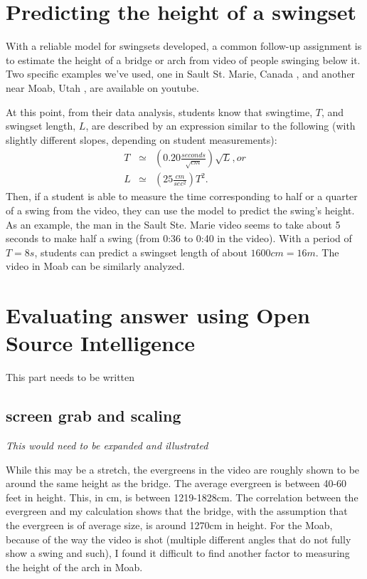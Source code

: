 \documentclass[12pt]{iopart}
\newcommand{\bea}{\begin{eqnarray}}
\newcommand{\eea}{\end{eqnarray}}
\begin{document}
\section{Predicting the height of a swingset}
With a reliable model for swingsets developed, a common follow-up assignment is to estimate the height of a bridge or arch from video of people swinging below it.  Two specific examples we've used, one in Sault St. Marie, Canada \cite{swingset-sault-ste-marie}, and another near Moab, Utah \cite{swingset-Moab}, are available on youtube.  

At this point, from their data analysis, students know that swingtime, $T$, and swingset length, $L$, are described by an expression similar to the following (with slightly different slopes, depending on student measurements):
\bea
T &\simeq& \left( 0.20\frac{seconds}{\sqrt{cm}} \right) \sqrt{L}, or\\
L &\simeq& \left( 25 \frac{cm}{sec^2} \right) T^2.
\eea
Then, if a student is able to measure the time corresponding to half or a quarter of a swing from the video, they can use the model to predict the swing's height.  As an example, the man in the Sault Ste. Marie video seems to take about 5 seconds to make half a swing (from 0:36 to 0:40 in the video)\cite{details}.  With a period of $T=8s$, students can predict a swingset length of about $1600cm=16m$.  
The video in Moab can be similarly analyzed.   

\section{Evaluating answer using Open Source Intelligence}
This part needs to be written

\subsection{screen grab and scaling}
\textit{This would need to be expanded and illustrated}

While this may be a stretch, the evergreens in the video are roughly shown to be around the same height as the bridge. The average evergreen is between 40-60 feet in height. This, in cm, is between 1219-1828cm. The correlation between the evergreen and my calculation shows that the bridge, with the assumption that the evergreen is of average size, is around 1270cm in height.         For the Moab, because of the way the video is shot (multiple different angles that do not fully show a swing and such), I found it difficult to find another factor to measuring the height of the arch in Moab.
\end{document}
